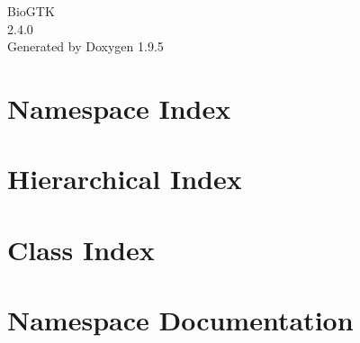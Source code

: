 \documentclass[twoside]{book}
\newcommand{\+}{\discretionary{\mbox{\scriptsize$\hookleftarrow$}}{}{}}
\newcommand{\clearemptydoublepage}{%
    \newpage{\pagestyle{empty}\cleardoublepage}%
  }
\begin{document}
  \raggedbottom
    \hypersetup{pageanchor=false,
                bookmarksnumbered=true,
                pdfencoding=unicode
               }
  \begin{titlepage}
  \vspace*{7cm}
  \begin{center}%
  {\Large Bio\+GTK}\\
  [1ex]\large 2.\+4.\+0 \\
  \vspace*{1cm}
  {\large Generated by Doxygen 1.9.5}\\
  \end{center}
  \end{titlepage}
  \clearemptydoublepage
  \tableofcontents
  \clearemptydoublepage
  \hypersetup{pageanchor=true}
\chapter{Namespace Index}

\chapter{Hierarchical Index}

\chapter{Class Index}

\chapter{Namespace Documentation}



\end{document}
